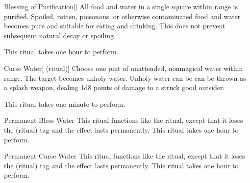 \lowercase{\hypertarget{spell:Blessing of Purification}{}}\label{spell:Blessing of Purification}
\begin{apability}[\nth{1}]{\hypertarget{spell:Blessing of Purification}{Blessing of Purification}}[]
All food and water in a single square within \rngclose range is purified.
Spoiled, rotten, poisonous, or otherwise contaminated food and water becomes pure and suitable for eating and drinking.
This does not prevent subsequent natural decay or spoiling.

This ritual takes one hour to perform.
\end{apability}
\vspace{0.25em}



\lowercase{\hypertarget{spell:Curse Water}{}}\label{spell:Curse Water}
\begin{attuneability}[\nth{1}]{\hypertarget{spell:Curse Water}{Curse Water}}[ (ritual)]
Choose one pint of unattended, nonmagical water within \rngclose range.
The target becomes unholy water.
Unholy water can be can be thrown as a splash weapon, dealing 1d8 points of damage to a struck good outsider.

This ritual takes one minute to perform.
\end{attuneability}
\vspace{0.25em}



\lowercase{\hypertarget{spell:Permanent Bless Water}{}}\label{spell:Permanent Bless Water}
\begin{apability}[\nth{2}]{\hypertarget{spell:Permanent Bless Water}{Permanent Bless Water}}
This ritual functions like the  ritual, except that it loses the  (ritual) tag and the effect lasts permanently.
This ritual takes one hour to perform.
\end{apability}
\vspace{0.25em}



\lowercase{\hypertarget{spell:Permanent Curse Water}{}}\label{spell:Permanent Curse Water}
\begin{apability}[\nth{2}]{\hypertarget{spell:Permanent Curse Water}{Permanent Curse Water}}
This ritual functions like the  ritual, except that it loses the  (ritual) tag and the effect lasts permanently.
This ritual takes one hour to perform.
\end{apability}
\vspace{0.25em}



